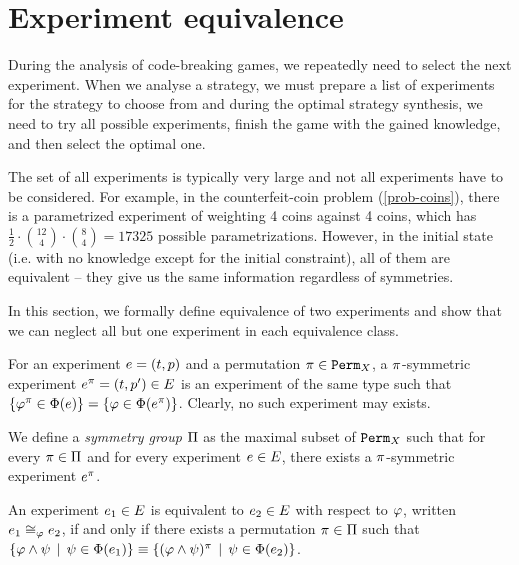 \section{Experiment equivalence} \label{sec:expeq}

During the analysis of code-breaking games,
  we repeatedly need to select the next experiment.
When we analyse a strategy, we must prepare a list of experiments
  for the strategy to choose from and
  during the optimal strategy synthesis,
  we need to try all possible experiments, finish the game with the gained knowledge,
  and then select the optimal one.

The set of all experiments is typically very large and not all experiments
  have to be considered.
For example, in the counterfeit-coin problem (\ref{prob-coins}),
  there is a parametrized experiment of weighting 4 coins against 4 coins,
  which has $\frac{1}{2}\cdot {12 \choose 4}\cdot{8 \choose 4} = 17325$
 possible parametrizations.
However, in the initial state
  (i.e. with no knowledge except for the initial constraint),
  all of them are equivalent -- they give us
  the same information regardless of symmetries.

In this section, we formally define equivalence of two experiments
 and show that we can neglect all but one experiment in each equivalence class.

\begin{definition}
For an experiment $e = (t, p)$ and a permutation $\pi\in\mathtt{Perm}_X$,
  a $\pi$-symmetric experiment $e^\pi = (t, p')\in E$
  is an experiment of the same type such that
  $\{\varphi^\pi \in\Phi(e)\} = \{\varphi\in\Phi(e^\pi)\}$.
Clearly, no such experiment may exists.
\end{definition}

\begin{definition}
We define a \emph{symmetry group} $\Pi$ as
  the maximal subset of $\mathtt{Perm}_X$ such that for
  every $\pi\in\Pi$ and for every experiment $e\in E$,
  there exists a $\pi$-symmetric experiment $e^\pi$.
\end{definition}

\begin{definition} \label{def:expeq}
An experiment $e_1\in E$ is equivalent to $e_2\in E$ with respect to $\varphi$,
  written $e_1\cong_{\varphi}e_2$,
  if and only if there exists a permutation $\pi\in\Pi$ such that
 $ \{ \varphi\wedge\psi \:\:|\:\: \psi\in\Phi(e_1) \} \equiv
   \{ (\varphi\wedge\psi)^\pi \:\:|\:\: \psi\in\Phi(e_2) \} $.
\end{definition}

